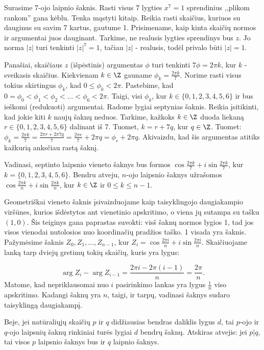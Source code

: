 Surasime 7-ojo laipnio šaknis. Rasti visus 7 lygties $x^7=1$ sprendinius ,,plikom rankom'' gana kėblu. Tenka mąstyti kitaip. Reikia rasti skaičius, kuriuos su dauginus su savim 7 kartus, gautume 1. Prisimename, kaip kinta skaičių normos ir argumentai juos dauginant. Tarkime, ne realusis lygties sprendinys bus $z$. Jo norma $|z|$ turi tenkinti $|z|^7=1$, tačiau $|z|$ - realusis, todėl privalo būti $|z|=1$. 

Panašiai, skaičiaus $z$ (išpėstinis) argumentas $\phi$ turi tenkinti $7\phi=2\pi k$, kur $k$ - sveikasis skaičius. Kiekvienam $k\in\Z$ gauname $\phi _k=\frac{2\pi k}{7}$. Norime rasti visus tokius skirtingus $\phi _k$, kad $0\leq \phi _k < 2\pi$. Pastebime, kad $0=\phi _0<\phi _1<\phi _2<...<\phi _6<2 \pi $. Taigi, visi $\phi _k$, kur $k\in\{0,1,2,3,4,5,6\}$ ir bus ieškomi (redukuoti) argumentai. Radome lygiai septynias šaknis. Reikia įsitikinti, kad jokie kiti $k$ naujų šaknų neduos. Tarkime, kažkoks $k\in\Z$ duoda liekaną $r\in\{0,1,2,3,4,5,6\}$ dalinant iš 7. Tuomet, $k=r+7q$, kur $q\in\Z$. Tuomet: $\phi _k=\frac{2\pi k}{7}=\frac{2\pi r+2\pi 7q}{7}=\frac{2\pi r}{7}+2\pi q=\phi _r+2\pi q$. Akivaizdu, kad šis argumentas atitiks kažkurią anksčiau rastą šaknį. 

Vadinasi, septinto laipsnio vieneto šaknys bus formos $\cos{\frac{2\pi k}{7}}+i\sin{\frac{2\pi k}{7}}$, kur $k=\{ 0,1,2,3,4,5,6\} $. Bendru atveju, $n$-ojo laipsnio šaknys užrašomos $\cos{\frac{2\pi k}{n}}+ i\sin{\frac{2\pi k}{n}}$, kur $k\in\Z$ ir $0\leq k\leq n-1$.

Geometriškai vieneto šaknis įsivaizduojame kaip taisyklingojo daugiakampio viršūnes, kurios išdėstytos ant vienetinio apskritimo, o viena jų sutampa su tašku $(1,0)$. Šis teiginys gana paprastas suvokti: visš šaknų normos lygios 1, tad jos visos vienodai nutolosios nuo koordinačių pradžios taško. 1 visada yra šaknis. Pažymėsime šaknis $Z_0, Z_1,...,Z_{n-1}$, kur $Z_i=\cos{\frac{2\pi i}{n}}+ i\sin{\frac{2\pi i}{n}}$. Skaičiuojame lanką tarp dviejų gretimų tokių skaičių, kuris yra lygus:

$$\arg Z_i-\arg Z_{i-1}=\frac{2\pi i-2\pi (i-1)}{n}=\frac{2\pi}{n}.$$ Matome, kad nepriklausomai nuo $i$ pasirinkimo lankas yra lygus $\frac{1}{n}$ viso apskritimo. Kadangi šaknų yra $n$, taigi, ir tarpų, vadinasi šaknys sudaro taisyklingą daugiakampį. 

Beje, jei natūraliųjų skaičių $p$ ir $q$ didžiausias bendras daliklis lygus $d$, tai $p$-ojo ir $q$-ojo laipsnių šaknų rinkiniai turės lygiai $d$ bendrų šaknų. Atskiras atvejis: jei $p|q$, tai visos $p$ laipsnio šaknys bus ir $q$ laipnio šaknys.

